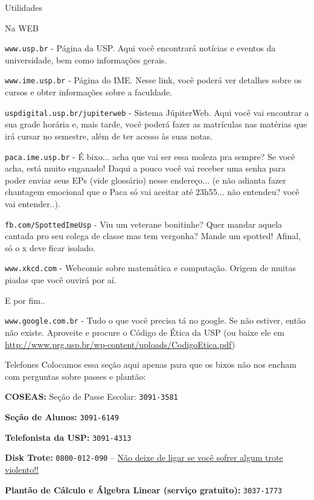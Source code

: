 \begin{secao}{Utilidades}

\begin{subsecao}{Na WEB}

{\tt www.usp.br} - Página da USP. Aqui você encontrará notícias e eventos da
universidade, bem como informações gerais.

{\tt www.ime.usp.br} - Página do IME.
Nesse link, você poderá ver detalhes sobre os cursos e obter informações sobre
a faculdade.

{\tt uspdigital.usp.br/jupiterweb} - Sistema JúpiterWeb. Aqui você vai
encontrar a sua grade horária e, mais tarde, você poderá fazer as matrículas nas
matérias que irá cursar no semestre, além de ter acesso às suas notas.

{\tt paca.ime.usp.br} - É bixo... acha que vai ser essa moleza pra sempre? Se
você acha, está muito enganado! Daqui a pouco você vai receber uma senha para
poder enviar seus EPs (vide glossário) nesse endereço... (e não adianta fazer
chantagem emocional que o Paca só vai aceitar até 23h55... não entendeu? você
vai entender..).

{\tt fb.com/SpottedImeUsp} - Viu um veterane bonitinhe? Quer mandar aquela
cantada pro seu colega de classe mas tem vergonha? Mande um spotted! Afinal,
só o x deve ficar isolado.

{\tt www.xkcd.com} - Webcomic sobre matemática e computação. Origem de muitas
piadas que você ouvirá por aí.

E por fim..

{\tt www.google.com.br} - Tudo o que você precisa tá no google. Se não estiver,
então não existe. Aproveite e procure o Código de Ética da USP (ou baixe ele em
\url{http://www.prg.usp.br/wp-content/uploads/CodigoEtica.pdf})

\end{subsecao}

\begin{subsecao}{Telefones}
Colocamos essa seção aqui apenas para que os bixos não nos encham com perguntas
sobre passes e plantão:

{\bf COSEAS:} Seção de Passe Escolar: {\tt 3091-3581}

{\bf Seção de Alunos:} {\tt 3091-6149}

{\bf Telefonista da USP:} {\tt 3091-4313}

{\bf Disk Trote:} {\tt 0800-012-090} -- \underline{Não deixe de ligar se você sofrer algum trote violento!!}

{\bf Plantão de Cálculo e Álgebra Linear (serviço gratuito):} {\tt 3037-1773}

\end{subsecao}
\end{secao}
